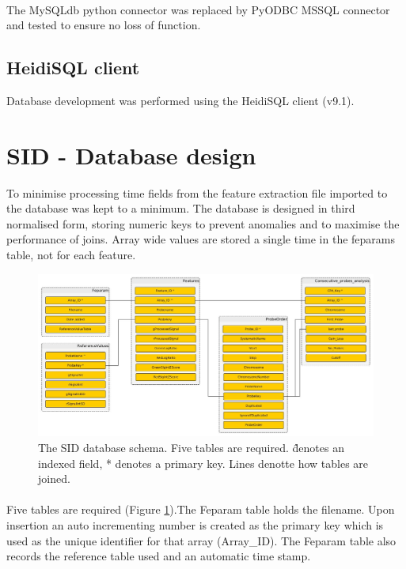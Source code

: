 \paragraph*{}
The MySQLdb python connector was replaced by PyODBC MSSQL connector \cite{pyodbc_mkleehammer/pyodbc_????} and tested to ensure no loss of function.

\subsection{HeidiSQL client}
Database development was performed using the HeidiSQL client (v9.1)\cite{heidisql_heidisql_2016}.

\section{SID - Database design}
To minimise processing time fields from the feature extraction file imported to the database was kept to a minimum. The database is designed in third normalised form, storing numeric keys to prevent anomalies and to maximise the performance of joins. Array wide values are stored a single time in the feparams table, not for each feature.
\begin{figure}
\centering
\includegraphics[width=1\linewidth]{./Figures/SIDdbschema-simple}
\caption[The SID database schema]{The SID database schema. Five tables are required. \^ denotes an indexed field, * denotes a primary key. Lines denotte how tables are joined.}
\label{fig:SIDdbschema-simple}
\end{figure}

\paragraph*{}
Five tables are required (Figure \ref{fig:SIDdbschema-simple}).The Feparam table holds the filename. Upon insertion an auto incrementing number is created as the primary key which is used as the unique identifier for that array (Array\_ID). The Feparam table also records the reference table used  and an automatic time stamp. 
